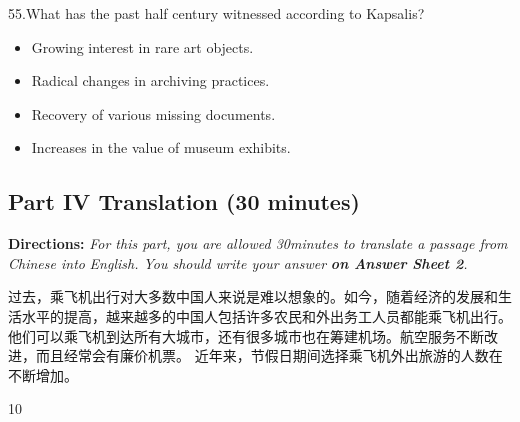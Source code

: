 \documentclass[UTF8,11pt]{ctexart}
\begin{document}
55.What has the past half century witnessed according to Kapsalis?


\begin{itemize}[leftmargin=2em,itemsep=.2em,topsep=.4em]\item[A.] Growing interest in rare art objects.
\item[B.] Radical changes in archiving practices.
\item[C.] Recovery of various missing documents.
\item[D.] Increases in the value of museum exhibits.
\end{itemize}

\subsection*{\textbf{Part IV} \textbf{Translation} \textbf{(30 minutes)}}


\textbf{Directions:}\textit{ For this part, you are allowed 30minutes to translate a passage from Chinese into} \textit{English. You should write your answer}\textbf{\textit{ on Answer Sheet 2}}\textit{.}


过去，乘飞机出行对大多数中国人来说是难以想象的。如今，随着经济的发展和生活水平的提高，越来越多的中国人包括许多农民和外出务工人员都能乘飞机出行。他们可以乘飞机到达所有大城市，还有很多城市也在筹建机场。航空服务不断改进，而且经常会有廉价机票。 近年来，节假日期间选择乘飞机外出旅游的人数在不断增加。


10
\end{document}
